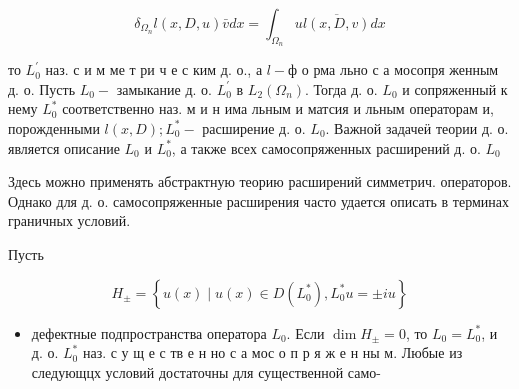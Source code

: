 \documentclass[10pt]{article}
\begin{document}
\[

\delta_{\Omega_{n}} l(x, D, u) \bar{v} d x=\int_{\Omega_{n}} u \overline{l(x, D, v)} d x

\]



то $L_{0}^{\prime}$ наз. с и м ме т ри ч е с ким д. о., а $l-ф$ о рма льно с а мосопря женным д. о. Пусть $L_{0}-$ замыкание д. о. $L_{0}^{\prime}$ в $L_{2}\left(\Omega_{n}\right)$. Тогда д. о. $L_{0}$ и сопряженный к нему $L_{0}^{*}$ соответственно наз. м и н има льным и матсия и льным операторам и, порожденными $l(x, D) ; L_{0}^{*}-$ расширение д. о. $L_{0}$. Важной задачеӥ теории д. о. является описание $L_{0}$ и $L_{0}^{*}$, а также всех самосопряженных расширений д. о. $L_{0}$



Здесь можно применять абстрактную теорию расширений симметрич. операторов. Однако для д. о. самосопряженные расширения часто удается описать в терминах граничных условий.



Пусть



\[

H_{ \pm}=\left\{u(x) \mid u(x) \in D\left(L_{0}^{*}\right), L_{0}^{*} u= \pm i u\right\}

\]



\begin{itemize}

  \item дефектные подпространства оператора $L_{0}$. Если $\operatorname{dim} H_{ \pm}=0$, то $L_{0}=L_{0}^{*}$, и д. о. $L_{0}^{*}$ наз. с у щ е с тв е н но с а мос о п р я ж е н ны м. Любые из следующцх условий достаточны для существенной само-

\end{itemize}
\end{document}
